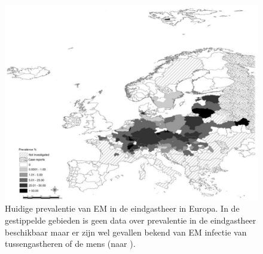 \documentclass[twoside]{extreport}
\begin{document}
\begin{figure}

{\centering \includegraphics[width=1\linewidth]{Distribution} 

}

\caption{Huidige prevalentie van EM in de eindgastheer in Europa. In
de gestippelde gebieden is geen data over prevalentie in de eindgastheer
beschikbaar maar er zijn wel gevallen bekend van EM infectie van
tussengastheren of de mens (naar \citet{deplazes2017global}).}\label{fig:preval}
\end{figure}

\newpage
\end{document}

